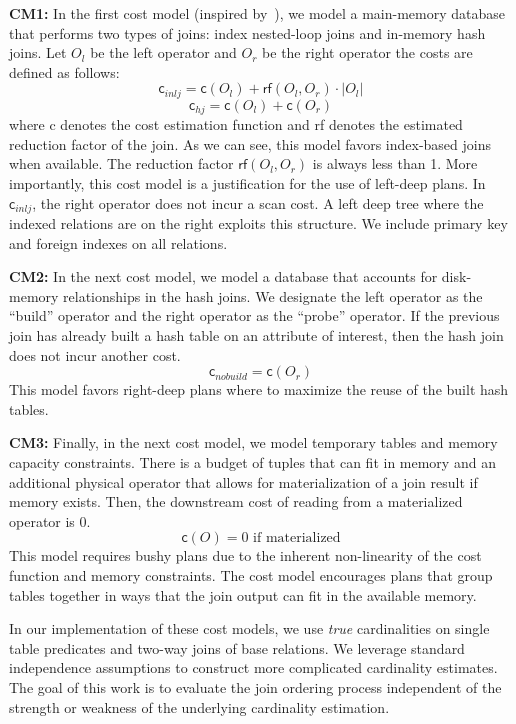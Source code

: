 \vspace{0.25em} \noindent \textbf{CM1: } In the first cost model (inspired by~\cite{leis2015good}), we model a main-memory database that performs two types of joins: index nested-loop joins and in-memory hash joins. Let $O_l$ be the left operator and $O_r$ be the right operator the costs are defined as follows:
\[
\textsf{c}_{inlj} = \textsf{c}(O_l) + \textsf{rf}(O_l, O_r) \cdot |O_l|
\]
\[
\textsf{c}_{hj} = \textsf{c}(O_l) + \textsf{c}(O_r)
\]
where \textsf{c} denotes the cost estimation function and \textsf{rf} denotes the estimated reduction factor of the join.
As we can see, this model favors index-based joins when available. 
The reduction factor $\textsf{rf}(O_l, O_r)$ is always less than 1.
More importantly, this cost model is a justification for the use of left-deep plans.
In $\textsf{c}_{inlj}$, the right operator does not incur a scan cost.
A left deep tree where the indexed relations are on the right exploits this structure. We include primary key and foreign indexes on all relations.


\vspace{0.25em} \noindent \textbf{CM2: } In the next cost model, we model a database that accounts for disk-memory relationships in the hash joins. We designate the left operator as the ``build'' operator and the right operator as the ``probe'' operator. 
If the previous join has already built a hash table on an attribute of interest, then the hash join does not incur another cost.
\[
\textsf{c}_{nobuild} = \textsf{c}(O_r)
\]
This model favors right-deep plans where to maximize the reuse of the built hash tables.


\vspace{0.25em} \noindent \textbf{CM3: } Finally, in the next cost model, we model temporary tables and memory capacity constraints. There is a budget of tuples that can fit in memory and an additional physical operator that allows for materialization of a join result if memory exists. Then, the downstream cost of reading from a materialized operator is 0.   
\[
\textsf{c}(O) = 0 \text{ if materialized}
\]
This model requires bushy plans due to the inherent non-linearity of the cost function and memory constraints. 
The cost model encourages plans that group tables together in ways that the join output can fit in the available memory.

\vspace{0.5em} In our implementation of these cost models, we use \emph{true} cardinalities on single table predicates and two-way joins of base relations. We leverage standard independence assumptions to construct more complicated cardinality estimates. The goal of this work is to evaluate the join ordering process independent of the strength or weakness of the underlying cardinality estimation. 

